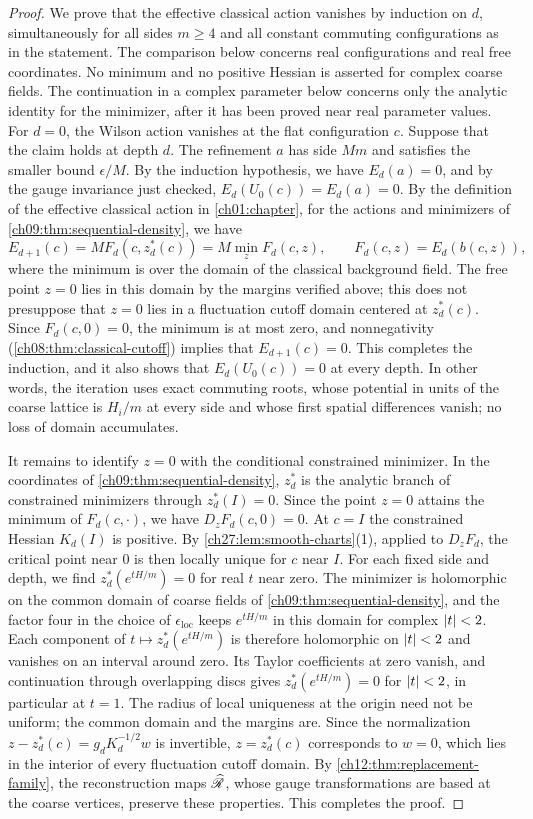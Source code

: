 \begin{proof}
We prove that the effective classical action vanishes by induction on $d$, simultaneously for all sides $m\ge4$ and all constant commuting configurations as in the statement. The comparison below concerns real configurations and real free coordinates. No minimum and no positive Hessian is asserted for complex coarse fields. The continuation in a complex parameter below concerns only the analytic identity for the minimizer, after it has been proved near real parameter values. For $d=0$, the Wilson action vanishes at the flat configuration $c$. Suppose that the claim holds at depth $d$. The refinement $a$ has side $Mm$ and satisfies the smaller bound $\epsilon/M$. By the induction hypothesis, we have $E_d(a)=0$, and by the gauge invariance just checked, $E_d(U_0(c))=E_d(a)=0$. By the definition of the effective classical action in \cref{ch01:chapter}, for the actions and minimizers of \cref{ch09:thm:sequential-density}, we have
\[
 E_{d+1}(c)=MF_d(c,z_d^*(c))=M\min_zF_d(c,z),\qquad F_d(c,z)=E_d(b(c,z)),
\]
where the minimum is over the domain of the classical background field. The free point $z=0$ lies in this domain by the margins verified above; this does not presuppose that $z=0$ lies in a fluctuation cutoff domain centered at $z_d^*(c)$. Since $F_d(c,0)=0$, the minimum is at most zero, and nonnegativity (\cref{ch08:thm:classical-cutoff}) implies that $E_{d+1}(c)=0$. This completes the induction, and it also shows that $E_d(U_0(c))=0$ at every depth. In other words, the iteration uses exact commuting roots, whose potential in units of the coarse lattice is $H_i/m$ at every side and whose first spatial differences vanish; no loss of domain accumulates.

It remains to identify $z=0$ with the conditional constrained minimizer. In the coordinates of \cref{ch09:thm:sequential-density}, $z_d^*$ is the analytic branch of constrained minimizers through $z_d^*(I)=0$. Since the point $z=0$ attains the minimum of $F_d(c,\cdot)$, we have $D_zF_d(c,0)=0$. At $c=I$ the constrained Hessian $K_d(I)$ is positive. By \cref{ch27:lem:smooth-charts}(1), applied to $D_zF_d$, the critical point near $0$ is then locally unique for $c$ near $I$. For each fixed side and depth, we find $z_d^*(e^{tH/m})=0$ for real $t$ near zero. The minimizer is holomorphic on the common domain of coarse fields of \cref{ch09:thm:sequential-density}, and the factor four in the choice of $\epsilon_{\mathrm{loc}}$ keeps $e^{tH/m}$ in this domain for complex $\lvert t\rvert<2$. Each component of $t\mapsto z_d^*(e^{tH/m})$ is therefore holomorphic on $\lvert t\rvert<2$ and vanishes on an interval around zero. Its Taylor coefficients at zero vanish, and continuation through overlapping discs gives $z_d^*(e^{tH/m})=0$ for $\lvert t\rvert<2$, in particular at $t=1$. The radius of local uniqueness at the origin need not be uniform; the common domain and the margins are. Since the normalization $z-z_d^*(c)=g_dK_d^{-1/2}w$ is invertible, $z=z_d^*(c)$ corresponds to $w=0$, which lies in the interior of every fluctuation cutoff domain. By \cref{ch12:thm:replacement-family}, the reconstruction maps $\widehat{\mathscr R}$, whose gauge transformations are based at the coarse vertices, preserve these properties. This completes the proof.
\end{proof}

